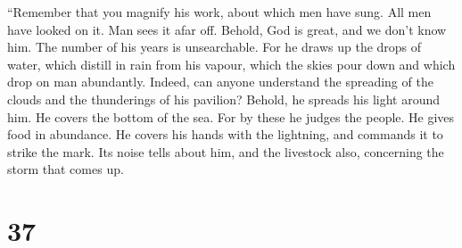  ``Remember that you magnify his work, about which men
have sung.  All men have looked on it. Man sees it afar
off.  Behold, God is great, and we don't know him. The
number of his years is unsearchable.  For he draws up the
drops of water, which distill in rain from his vapour, 
which the skies pour down and which drop on man abundantly.
 Indeed, can anyone understand the spreading of the
clouds and the thunderings of his pavilion?  Behold, he
spreads his light around him. He covers the bottom of the sea.
 For by these he judges the people. He gives food in
abundance.  He covers his hands with the lightning, and
commands it to strike the mark.  Its noise tells about
him, and the livestock also, concerning the storm that comes up.

\hypertarget{section-36}{%
\section{37}\label{section-36}}

